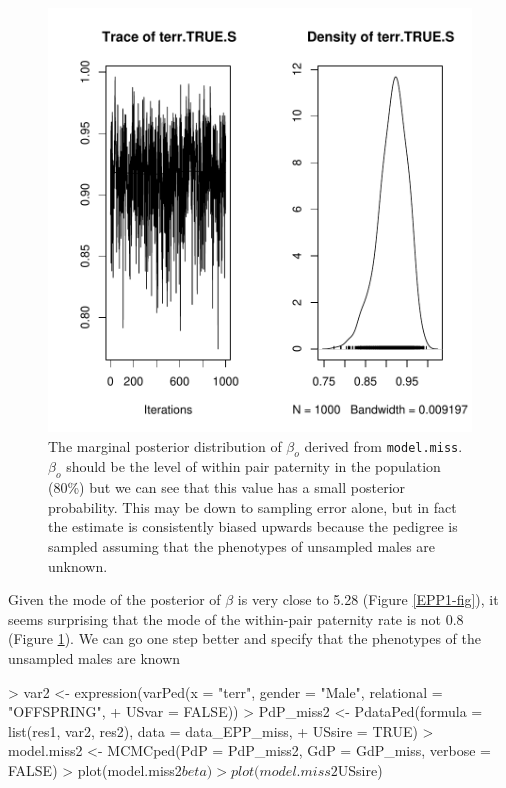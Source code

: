 \documentclass{article}
\begin{document}
\begin{figure}[!h]
\begin{center}
\includegraphics{Tutorial-073}
\end{center}
\caption{The marginal posterior distribution of $\beta_{o}$ derived from \texttt{model.miss}.  $\beta_{o}$ should be the level of within pair paternity in the population (80\%) but we can see that this value has a small posterior probability.  This may be down to sampling error alone, but in fact the estimate is consistently biased upwards because the pedigree is sampled assuming that the phenotypes of unsampled males are unknown.}
\label{EPP1Test-fig}
\end{figure}


Given the mode of the posterior of $\beta$ is very close to 5.28 (Figure \ref{EPP1-fig}), it seems surprising that the mode of the within-pair paternity rate is not 0.8 (Figure \ref{EPP1Test-fig}). We can go one step better and specify that the phenotypes of the unsampled males are known 

\begin{Schunk}
\begin{Sinput}
> var2 <- expression(varPed(x = "terr", gender = "Male", relational = "OFFSPRING", 
+     USvar = FALSE))
> PdP_miss2 <- PdataPed(formula = list(res1, var2, res2), data = data_EPP_miss, 
+     USsire = TRUE)
> model.miss2 <- MCMCped(PdP = PdP_miss2, GdP = GdP_miss, verbose = FALSE)
> plot(model.miss2$beta)
> plot(model.miss2$USsire)
\end{Sinput}
\end{Schunk}
\end{document}

